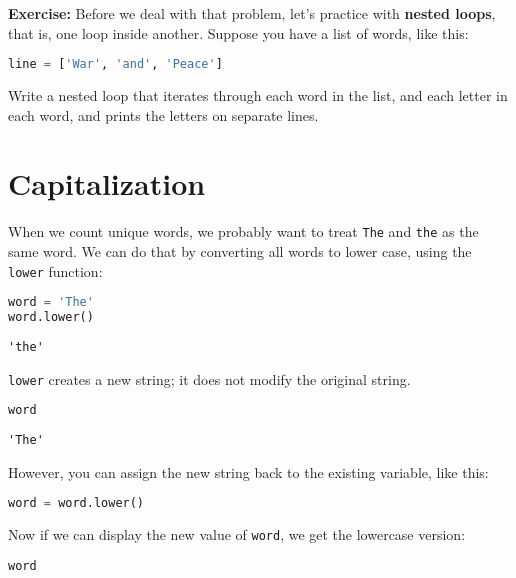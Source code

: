 \textbf{Exercise:} Before we deal with that problem, let's practice with
\textbf{nested loops}, that is, one loop inside another. Suppose you
have a list of words, like this:

\begin{lstlisting}[language=Python]
line = ['War', 'and', 'Peace']
\end{lstlisting}

Write a nested loop that iterates through each word in the list, and
each letter in each word, and prints the letters on separate lines.

\hypertarget{capitalization}{%
\section{Capitalization}\label{capitalization}}

When we count unique words, we probably want to treat
\passthrough{\lstinline!The!} and \passthrough{\lstinline!the!} as the
same word. We can do that by converting all words to lower case, using
the \passthrough{\lstinline!lower!} function:

\begin{lstlisting}[language=Python]
word = 'The'
word.lower()
\end{lstlisting}

\begin{lstlisting}[]
'the'
\end{lstlisting}

\passthrough{\lstinline!lower!} creates a new string; it does not modify
the original string.

\begin{lstlisting}[language=Python]
word
\end{lstlisting}

\begin{lstlisting}[]
'The'
\end{lstlisting}

However, you can assign the new string back to the existing variable,
like this:

\begin{lstlisting}[language=Python]
word = word.lower()
\end{lstlisting}

Now if we can display the new value of \passthrough{\lstinline!word!},
we get the lowercase version:

\begin{lstlisting}[language=Python]
word
\end{lstlisting}

